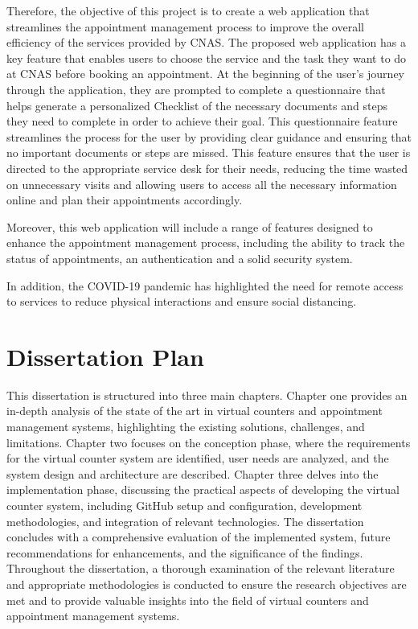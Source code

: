 Therefore, the objective of this project is to create a web application that streamlines the appointment management process to improve the overall efficiency of the services provided by CNAS. The proposed web application has a key feature that enables users to choose the service and the task they want to do at CNAS before booking an appointment. At the beginning of the user's journey through the application, they are prompted to complete a questionnaire that helps generate a personalized Checklist of the necessary documents and steps they need to complete in order to achieve their goal. This questionnaire feature streamlines the process for the user by providing clear guidance and ensuring that no important documents or steps are missed. This feature ensures that the user is directed to the appropriate service desk for their needs, reducing the time wasted on unnecessary visits and allowing users to access all the necessary information online and plan their appointments accordingly.

Moreover, this web application will include a range of features designed to enhance the appointment management process, including the ability to track the status of appointments, an authentication and a solid security system.

In addition, the COVID-19 pandemic has highlighted the need for remote access to services to reduce physical interactions and ensure social distancing.
\newpage
{}

\section*{Dissertation Plan}

This dissertation is structured into three main chapters. Chapter one provides an in-depth analysis of the state of the art in virtual counters and appointment management systems, highlighting the existing solutions, challenges, and limitations. Chapter two focuses on the conception phase, where the requirements for the virtual counter system are identified, user needs are analyzed, and the system design and architecture are described. Chapter three delves into the implementation phase, discussing the practical aspects of developing the virtual counter system, including GitHub setup and configuration, development methodologies, and integration of relevant technologies. The dissertation concludes with a comprehensive evaluation of the implemented system, future recommendations for enhancements, and the significance of the findings. Throughout the dissertation, a thorough examination of the relevant literature and appropriate methodologies is conducted to ensure the research objectives are met and to provide valuable insights into the field of virtual counters and appointment management systems.

